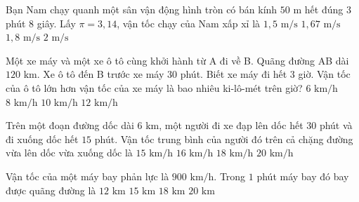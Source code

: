 \begin{ex} %
Bạn Nam chạy quanh một sân vận động hình tròn có bán kính $50\text{ m}$ hết đúng $3$ phút $8$ giây. Lấy $\pi = 3{,}14$, vận tốc chạy của Nam xấp xỉ là
\choice
{$1{,}5\text{ m/s}$}
{\True $1{,}67\text{ m/s}$}
{$1{,}8\text{ m/s}$}
{$2\text{ m/s}$}
\end{ex}

\begin{ex} %
Một xe máy và một xe ô tô cùng khởi hành từ A đi về B. Quãng đường AB dài $120\text{ km}$. Xe ô tô đến B trước xe máy $30$ phút. Biết xe máy đi hết $3$ giờ. Vận tốc của ô tô lớn hơn vận tốc của xe máy là bao nhiêu ki-lô-mét trên giờ?
\choice
{$6\text{ km/h}$}
{\True $8\text{ km/h}$}
{$10\text{ km/h}$}
{$12\text{ km/h}$}
\end{ex}

\begin{ex} %
Trên một đoạn đường dốc dài $6\text{ km}$, một người đi xe đạp lên dốc hết $30$ phút và đi xuống dốc hết $15$ phút. Vận tốc trung bình của người đó trên cả chặng đường vừa lên dốc vừa xuống dốc là
\choice
{$15\text{ km/h}$}
{\True $16\text{ km/h}$}
{$18\text{ km/h}$}
{$20\text{ km/h}$}
\end{ex}

\begin{ex} %
Vận tốc của một máy bay phản lực là $900\text{ km/h}$. Trong $1$ phút máy bay đó bay được quãng đường là
\choice
{$12\text{ km}$}
{\True $15\text{ km}$}
{$18\text{ km}$}
{$20\text{ km}$}
\end{ex}

